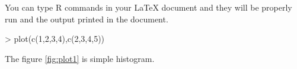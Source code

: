 \documentclass{article}
\begin{document}

You can type R commands in your \LaTeX{} document and they will be properly run and the output printed in the document.

\begin{Schunk}
\begin{Sinput}
> plot(c(1,2,3,4),c(2,3,4,5))
\end{Sinput}
\end{Schunk}
 
The figure \ref{fig:plot1} is simple histogram.
\end{document}
